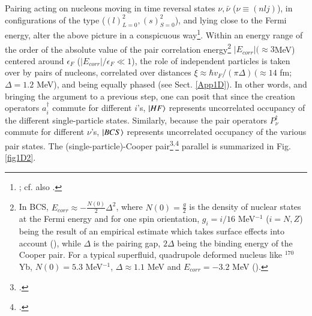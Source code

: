 Pairing acting on nucleons moving in time reversal states $\nu,\bar\nu$ ($\nu\equiv(nlj)$), in configurations of the type ($(l)^2_{L=0},(s)^2_{S=0}$), and lying close to the Fermi energy, alter the above picture in a conspicuous way\footnote{\cite{Bohr:58}; cf. also \cite{Broglia:13}.}. Within an energy range of the order of the absolute value of the pair correlation energy\footnote{In BCS, $E_{corr}\approx-\frac{N(0)}{2}\Delta^2$, where $N(0)=\frac{g}{2}$ is the density of nuclear states at the Fermi energy and for one spin orientation, $g_i=i/16$ MeV$^{-1}$ ($i=N,Z$) being the result of an empirical estimate which takes surface effects into account (\cite{Bohr:75,Bortignon:98}), while $\Delta$ is the pairing gap, $2\Delta$ being the binding energy of the Cooper pair. For a typical superfluid, quadrupole deformed nucleus like $^{170}$Yb, $N(0)=5.3$ MeV$^{-1}$, $\Delta\approx1.1$ MeV and $E_{corr}=-3.2$ MeV (\cite{Shimizu:89}).} $|E_{corr}|(\approx 3 $MeV) centered around $\epsilon_F$ ($|E_{corr}|/\epsilon_F\ll1$), the role of independent particles is taken over by  pairs of nucleons, correlated over distances $\xi\approx\hbar v_F/(\pi\Delta)\,(\approx 14$ fm; $\Delta=1.2$ MeV), and being equally phased (see Sect. \ref{App1D}). In other words, and bringing the argument to a previous step, one can posit that since the creation operators $a^\dagger_i$ commute for different $i$'s, $|{HF} \rangle$ represents uncorrelated occupancy of the different single-particle states. Similarly, because the pair operators $P^\dagger_\nu$ commute for different $\nu$'s, $|{BCS} \rangle$ represents uncorrelated occupancy of the various pair states.  The (single-particle)-Cooper pair\footnote{\cite{Cooper:56}.}$^{,}$\footnote{\cite{Brink:05}.} parallel is summarized in Fig. \ref{fig1D2}.


